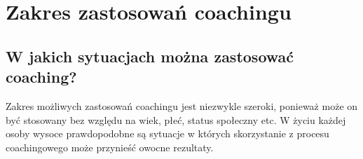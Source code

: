
\section{Zakres zastosowań coachingu}


\subsection{W jakich sytuacjach można zastosować coaching?}

Zakres możliwych zastosowań coachingu jest niezwykle szeroki, ponieważ może on być stosowany bez względu na wiek, płeć, status społeczny etc.
W życiu każdej osoby wysoce prawdopodobne są sytuacje w których skorzystanie z procesu coachingowego może przynieść owocne rezultaty.

